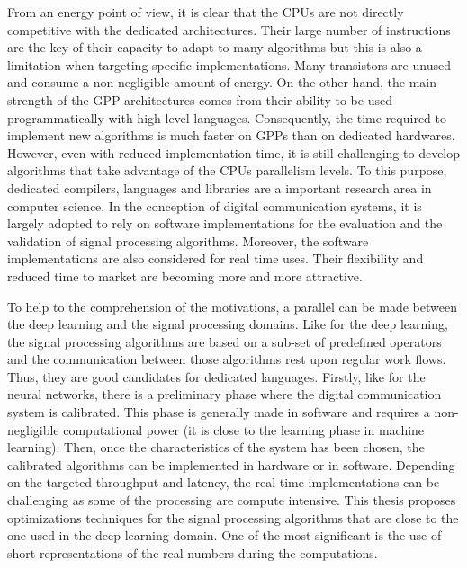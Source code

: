 From an energy point of view, it is clear that the CPUs are not directly
competitive with the dedicated architectures. Their large number of instructions
are the key of their capacity to adapt to many algorithms but this is also a
limitation when targeting specific implementations. Many transistors are
unused and consume a non-negligible amount of energy. On the other hand, the
main strength of the GPP architectures comes from their ability to be used
programmatically with high level languages. Consequently, the time required to
implement new algorithms is much faster on GPPs than on dedicated hardwares.
However, even with reduced implementation time, it is still challenging to
develop algorithms that take advantage of the CPUs parallelism levels. To this
purpose, dedicated compilers, languages and libraries are a important research
area in computer science. In the conception of digital communication systems, it
is largely adopted to rely on software implementations for the evaluation and
the validation of signal processing algorithms. Moreover, the software
implementations are also considered for real time uses. Their flexibility and
reduced time to market are becoming more and more attractive.

To help to the comprehension of the motivations, a parallel can be made between
the deep learning and the signal processing domains. Like for the deep learning,
the signal processing algorithms are based on a sub-set of predefined operators
and the communication between those algorithms rest upon regular work flows.
Thus, they are good candidates for dedicated languages. Firstly, like for the
neural networks, there is a preliminary phase where the digital communication
system is calibrated. This phase is generally made in software and requires
a non-negligible computational power (it is close to the learning phase in
machine learning). Then, once the characteristics of the system has been chosen,
the calibrated algorithms can be implemented in hardware or in software.
Depending on the targeted throughput and latency, the real-time implementations
can be challenging as some of the processing are compute intensive. This
thesis proposes optimizations techniques for the signal processing algorithms
that are close to the one used in the deep learning domain. One of the most
significant is the use of short representations of the real numbers during the
computations.